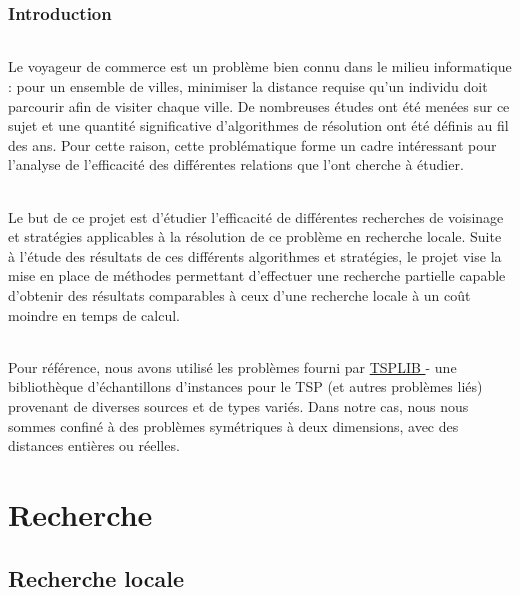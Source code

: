 \documentclass[a4paper,10pt]{report}
\begin{document}
\pagebreak
\section*{Introduction}

\paragraph{}
  Le voyageur de commerce est un problème bien connu dans le milieu informatique
: pour un ensemble de villes, minimiser la distance requise qu'un individu doit
parcourir afin de visiter chaque ville. De nombreuses études ont été menées sur
ce sujet et une quantité significative d'algorithmes de résolution ont été
définis au fil des ans. Pour cette raison, cette problématique forme un cadre
intéressant pour l'analyse de l'efficacité des différentes relations que l'ont
cherche à étudier.

\paragraph{} %
  Le but de ce projet est d'étudier l'efficacité de différentes recherches de
voisinage et stratégies applicables à la résolution de ce problème en recherche
locale. Suite à l'étude des résultats de ces différents algorithmes et
stratégies, le projet vise la mise en place de méthodes permettant d'effectuer
une recherche partielle capable d'obtenir des résultats comparables à ceux d'une
recherche locale à un coût moindre en temps de calcul.


\paragraph{} %
  Pour référence, nous avons utilisé les problèmes fourni par
\href{https://www.iwr.uni-heidelberg.de/groups/comopt/software/TSPLIB95/}{TSPLIB
}
- une bibliothèque d'échantillons d'instances pour le TSP (et autres problèmes
liés) provenant de diverses sources et de types variés. Dans notre cas, nous
nous sommes confiné à des problèmes symétriques à deux dimensions, avec des
distances entières ou réelles.


\part{Recherche}
\chapter{Recherche locale}
\end{document}
